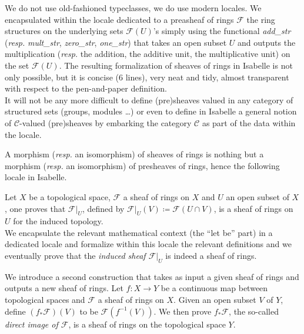 \documentclass[12pt]{scrartcl}
\begin{document}
We do not use old-fashioned typeclasses, we do use modern locales. We encapsulated within the locale dedicated to a preasheaf of rings $\mathscr{F}$ the ring structures on the underlying sets $\mathscr{F}(U)$'s simply using the functional \textit{add\_str} (\textit{resp.} \textit{mult\_str}, \textit{zero\_str}, \textit{one\_str}) that takes an open subset $U$ and outputs the multiplication (\textit{resp.} the addition, the additive unit, the multiplicative unit) on the set $\mathscr{F}(U)$. The resulting formalization of sheaves of rings in Isabelle is not only possible, but it is concise (6 lines), very neat and tidy, almost transparent with respect to the pen-and-paper definition. \\
It will not be any more difficult to define (pre)sheaves valued in any category of structured sets (groups, modules \dots) or even to define in Isabelle a general notion of $\mathscr{C}$-valued (pre)sheaves by embarking the category $\mathscr{C}$ as part of the data within the locale.  	


A morphism (\textit{resp.} an isomorphism) of sheaves of rings is nothing but a morphism (\textit{resp.} an isomorphism) of presheaves of rings, hence the following locale in Isabelle.


Let $X$ be a topological space, $\mathscr{F}$ a sheaf of rings on $X$ and $U$ an open subset of $X$,  one proves that $\mathscr{F}|_U$, defined by $\mathscr{F}|_U(V) \coloneqq \mathscr{F}(U \cap V)$, is a sheaf of rings on $U$ for the induced topology. \\
We encapsulate the relevant mathematical context (the ``let be'' part) in a dedicated locale and formalize within this locale the relevant definitions and we eventually prove  that the \emph{induced sheaf $\mathscr{F}|_U$} is indeed a sheaf of rings.


We introduce a second construction that takes as input a given sheaf of rings and outputs a new sheaf of rings. Let $f: X \rightarrow Y$ be a continuous map between topological spaces and $\mathscr{F}$ a sheaf of rings on $X$. Given an open subset $V$ of $Y$, define $(f_{*} \mathscr{F})(V)$ to be $\mathscr{F} (f^{-1}(V))$. We then prove $f_{*} \mathscr{F}$, the so-called \emph{direct image of  $\mathscr{F}$}, is a sheaf of rings on the topological space $Y$.  
\end{document}
